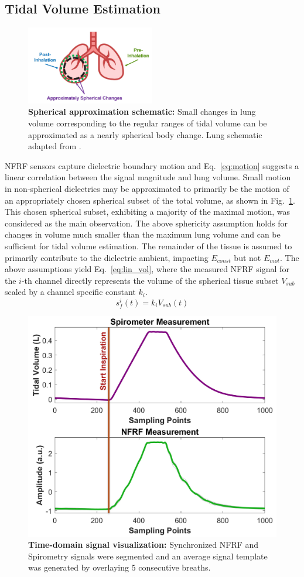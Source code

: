 \documentclass[journal]{IEEEtran}
\begin{document}
\subsection{Tidal Volume Estimation}
\begin{figure}[htbp]
    \centering
    \includegraphics[width=0.5\textwidth]{approx_sphere_v2.jpg}
    \caption{\textbf{Spherical approximation schematic:} Small changes in lung volume corresponding to the regular ranges of tidal volume can be approximated as a nearly spherical body change. Lung schematic adapted from \cite{lungImage}.}
    \label{fig:approx_sphere}
\end{figure}
NFRF sensors capture dielectric boundary motion and Eq.~\ref{eq:motion} suggests a linear correlation between the signal magnitude and lung volume. Small motion in non-spherical dielectrics may be approximated to primarily be the motion of an appropriately chosen spherical subset of the total volume, as shown in Fig.~\ref{fig:approx_sphere}. This chosen spherical subset, exhibiting a majority of the maximal motion, was considered as the main observation. The above sphericity assumption holds for changes in volume much smaller than the maximum lung volume and can be sufficient for tidal volume estimation. The remainder of the tissue is assumed to primarily contribute to the dielectric ambient, impacting $E_{const}$ but not $E_{mot}$. The above assumptions yield Eq.~\ref{eq:lin_vol}, where the measured NFRF signal for the $i$-th channel directly represents the volume of the spherical tissue subset $V_{sub}$ scaled by a channel specific constant $k_i$. 
\begin{equation}
    s_f^{i}(t) = k_{i} V_{sub}(t)
    \label{eq:lin_vol}
\end{equation}
\begin{figure}[h]
\centering
\includegraphics[width=.48\textwidth]{ncs_spiro.jpg}
\caption{\textbf{Time-domain signal visualization:} Synchronized NFRF and Spirometry signals were segmented and an average signal template was generated by overlaying 5 consecutive breaths.}
\label{fig:ncs_spiro_time}
\end{figure}
\end{document}
